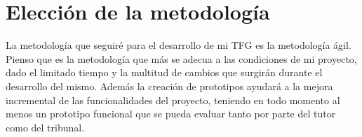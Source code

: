 \section{Elección de la metodología}

La metodología que seguiré para el desarrollo de mi TFG es la metodología ágil. Pienso que es la metodología que más se adecua a las condiciones de mi proyecto, dado el limitado tiempo y la multitud de cambios que surgirán durante el desarrollo del mismo. Además la creación de prototipos ayudará a la mejora incremental de las funcionalidades del proyecto, teniendo en todo momento al menos un prototipo funcional que se pueda evaluar tanto por parte del tutor como del tribunal.